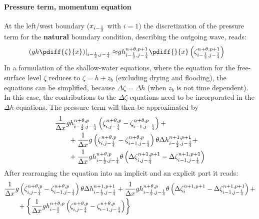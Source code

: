\paragraph*{Pressure term, momentum equation}
At the left/west boundary ($x_{i-\frac{1}{2}}$ with $i=1$) the discretization of the pressure term for the \textbf{natural} boundary condition, describing the outgoing wave, reads:
\begin{align}
    \left. \left(gh \pdiff{\zeta}{x}\right)\right|_{i-\half, j-\quart} \approx
    & g h^{n+\theta,p+1}_{i-\half, j-\quart} \pdiff{}{x} \left( \zeta^{n+\theta,p+1}_{i-\half, j-\quart}\right)
\end{align}
In a formulation of the shallow-water equations, where the equation for the free-surface level $\zeta$ reduces to $\zeta = h + z_b$ (excluding drying and flooding), the equations can be simplified, because $\Delta \zeta = \Delta h$ (when $z_b$ is not time dependent).
In this case, the contributions to the $\Delta \zeta$-equations need to be incorporated in the $\Delta h$-equations.
The pressure term will then be approximated by
\begin{align}
    & \frac{1}{\Delta x} g h^{n+\theta,p}_{i-\frac{1}{2}, j-\frac{1}{4}} \left( \zeta^{n+\theta,p}_{i, j-\frac{1}{4}} - \zeta^{n+\theta,p}_{i-1, j-\frac{1}{4}}  \right) +
    \nonumber \\*
    & \qquad + \frac{1}{\Delta x}  g \left(  \zeta^{n+\theta,p}_{i, j-\frac{1}{4}} - \zeta^{n+\theta,p}_{i-1, j-\frac{1}{4}} \right) \theta \Delta h^{n+1, p+1}_{i-\frac{1}{2}, j-\frac{1}{4}} +
    \nonumber \\*
    & \qquad +   \frac{1}{\Delta x} g h^{n+\theta, p}_{i-\frac{1}{2}, j-\frac{1}{4}}
    \theta \left( \Delta \zeta^{n+1,p+1}_{i, j-\frac{1}{4}}  - \Delta \zeta^{n+1,p+1}_{i-1, j-\frac{1}{4}}\right)
\end{align}
After rearranging the equation into an implicit and an explicit part it reads:
\begin{align}
    & \frac{1}{\Delta x}  g \left(  \zeta^{n+\theta,p}_{i, j-\frac{1}{4}} - \zeta^{n+\theta,p}_{i-1, j-\frac{1}{4}} \right) \theta \Delta h^{n+1, p+1}_{i-\frac{1}{2}, j-\frac{1}{4}} +
    \frac{1}{\Delta x} g h^{n+\theta, p}_{i-\frac{1}{2}, j-\frac{1}{4}}
    \theta \left( \Delta \zeta^{n+1,p+1}_{i}  - \Delta \zeta^{n+1,p+1}_{i-1, j-\frac{1}{4}}\right) +
    \nonumber \\*
    & \qquad + \left\{
    \frac{1}{\Delta x} g h^{n+\theta,p}_{i-\frac{1}{2}} \left( \zeta^{n+\theta,p}_{i, j-\frac{1}{4}} - \zeta^{n+\theta,p}_{i-1, j-\frac{1}{4}}  \right)  \right\}
\end{align}
